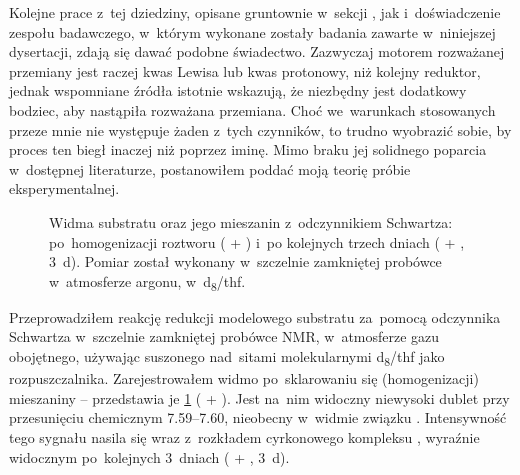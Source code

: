 Kolejne prace z~tej dziedziny, opisane gruntownie w~sekcji ,
  jak i~doświadczenie zespołu badawczego, w~którym wykonane zostały badania zawarte
  w~niniejszej dysertacji, zdają się dawać podobne świadectwo.
Zazwyczaj motorem rozważanej przemiany jest raczej kwas Lewisa lub kwas protonowy,
  niż kolejny reduktor, jednak wspomniane źródła istotnie wskazują,
  że niezbędny jest dodatkowy bodziec, aby nastąpiła rozważana przemiana.
Choć we~warunkach stosowanych przeze mnie nie występuje żaden z~tych czynników, to trudno wyobrazić sobie, by proces ten biegł inaczej niż poprzez iminę.
Mimo braku jej solidnego poparcia w~dostępnej literaturze, postanowiłem poddać moją teorię
  próbie eksperymentalnej.

\begin{figure}
  
  \caption{
    Widma \NMR*{} substratu  oraz jego mieszanin z~odczynnikiem Schwartza:
      po~homogenizacji roztworu ( + ) i~po kolejnych trzech dniach
      ( + , \SI{3}{\day}).
    Pomiar został wykonany w~szczelnie zamkniętej probówce w~atmosferze argonu,
      w~d\textsubscript{8}\-/\acrshort{thf}.
  }\label{fig:nmr-imine-trace}
\end{figure}

\begin{marginfigure}[-17.5em]
  
  \caption{
    Zbliżenie na~dublet widoczny na~\protect\cref{fig:nmr-imine-trace}, będący najpewniej
      sygnałem pochodzącym od~iminowego protonu, zaznaczonego zielonym kolorem w~strukturze
      na~\protect\cref{sch:zr-to-imine} (struktura~).
  }\label{fig:nmr-imine-expand}
\end{marginfigure}

Przeprowadziłem reakcję redukcji modelowego substratu  za~pomocą odczynnika
  Schwartza w~szczelnie zamkniętej probówce NMR, w~atmosferze gazu obojętnego, używając
  suszonego nad~sitami molekularnymi d\textsubscript{8}\-/\acrshort{thf} jako rozpuszczalnika.
Zarejestrowałem widmo \NMR*{} po~sklarowaniu się (homogenizacji) mieszaniny \--- przedstawia
  je \cref{fig:nmr-imine-trace} ( + ).
Jest na~nim widoczny niewysoki dublet przy przesunięciu chemicznym \SIrange{7.59}{7.60}{\ppm},
  nieobecny w~widmie związku .
Intensywność tego sygnału nasila się wraz z~rozkładem cyrkonowego kompleksu ,
  wyraźnie widocznym po~kolejnych 3~dniach
  ( + , \SI{3}{\day}).

